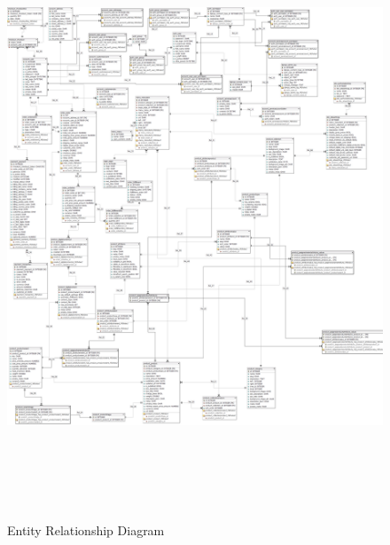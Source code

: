 \begin{figure}[H]
\includegraphics[width=15cm, height = 18cm, keepaspectratio]{images/PORS_ERD.png} 
\centering
\caption{Entity Relationship Diagram}
\label{erd}
\end{figure}
 
%

